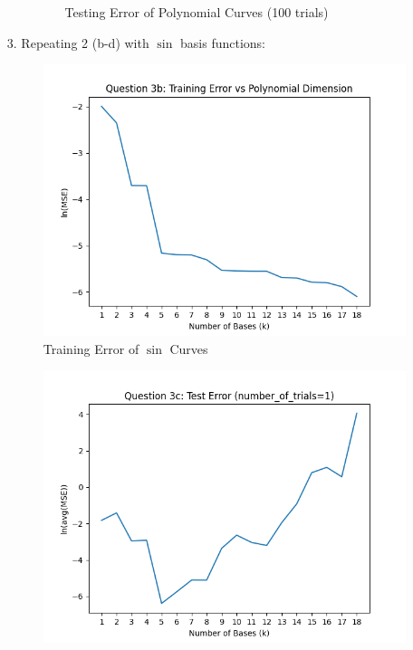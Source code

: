 \documentclass[12pt]{article}
\begin{document}
\begin{enumerate}[leftmargin=\labelsep]
\begin{enumerate}
\begin{figure}[h]
            \caption{Testing Error of Polynomial Curves (100 trials)}
            \label{fig:2d}
            \end{figure}
    \end{enumerate}
\newpage
\item[3.] Repeating 2 (b-d) with $\sin$ basis functions:
            \begin{figure}[h]
            \centering
            \includegraphics[scale=0.5]{outputs/python/q3/q3b}
            \caption{Training Error of $\sin$ Curves}
            \label{fig:3b}
            \end{figure}
            \begin{figure}[h]
            \centering
            \includegraphics[scale=0.5]{outputs/python/q3/q3c}

\end{figure}
\end{enumerate}
\end{document}
